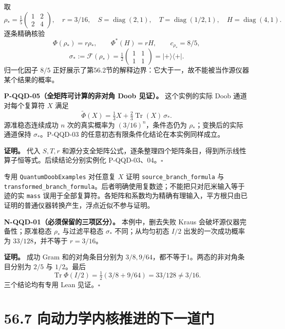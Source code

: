\documentclass[
  11pt,
  oneside]{book}
\begin{document}
取 \[
\rho_* =\tfrac15\begin{pmatrix}1&2\\2&4\end{pmatrix},\quad
r=3/16,\quad S=\operatorname{diag}(2,1),\quad
T=\operatorname{diag}(1/2,1),\quad H=\operatorname{diag}(4,1).
\] 逐条精确核验 \[
\Phi(\rho_*)=r\rho_*,\qquad \Phi^*(H)=rH,\qquad
c_{\rho_*}=8/5,
\] \[
\sigma_*:=\mathcal F(\rho_*)=\tfrac12\begin{pmatrix}1&1\\1&1\end{pmatrix}
=|+\rangle\langle+|.
\] 归一化因子 \(8/5\)
正好展示了第56.2节的解释边界：它大于一，故不能被当作源仪器某个结果的概率。

\protect\hypertarget{p-qqd-05}{}{}

\textbf{P-QQD-05（全矩阵可计算的非对角 Doob 见证）。} 这个实例的实际
Doob 通道对每个复算符 \(X\) 满足 \[
\widetilde\Phi(X)=\tfrac13X+\tfrac23\operatorname{Tr}(X)\,\sigma_*.
\] 源准稳态连续成功 \(n\) 次的真实概率为 \((3/16)^n\)，条件态仍为
\(\rho_*\)；变换后的实际通道保持 \(\sigma_*\)。P-QQD-03
的任意初态有限条件化结论在本实例同样成立。

\textbf{证明。} 代入 \(S,T,r\)
和源分支全矩阵公式，逐条整理四个矩阵条目，得到所示线性算子恒等式。后续结论分别实例化
P-QQD-03、04。\(\square\)

专用 \texttt{QuantumDoobExamples} 对任意复 \(X\) 证明
\texttt{source\_\allowbreak branch\_\allowbreak formula} 与
\texttt{transformed\_\allowbreak branch\_\allowbreak formula}。后者明确使用复数迹；不能把只对厄米输入等于迹的实
\texttt{mass}
误用于全部复算符。各矩阵和系数均为精确有理输入，平方根只由已证明的普通仪器转换产生，浮点近似不参与证明。

\protect\hypertarget{n-qqd-01}{}{}

\textbf{N-QQD-01（必须保留的三项区分）。} 本例中，删去失败 Kraus
会破坏源仪器完备性；原准稳态 \(\rho_*\) 与过滤平稳态 \(\sigma_*\)
不同；从均匀初态 \(I/2\) 出发的一次成功概率为 \(33/128\)，并不等于
\(r=3/16\)。

\textbf{证明。} 成功 Gram 和的对角条目分别为
\(3/8,9/64\)，都不等于1。两态的非对角条目分别为 \(2/5\) 与 \(1/2\)。最后
\[
\operatorname{Tr}\Phi(I/2)=\tfrac12(3/8+9/64)=33/128\ne3/16.
\] 三个结论均有专用 Lean 见证。\(\square\)

\hypertarget{ux5411ux52a8ux529bux5b66ux5185ux6838ux63a8ux8fdbux7684ux4e0bux4e00ux9053ux95e8}{%
\section{56.7
向动力学内核推进的下一道门}\label{ux5411ux52a8ux529bux5b66ux5185ux6838ux63a8ux8fdbux7684ux4e0bux4e00ux9053ux95e8}}
\end{document}
